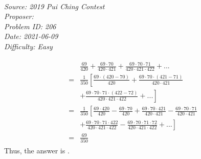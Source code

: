 \SSbreak\\
\emph{Source: 2019 Pui Ching Contest}\\
\emph{Proposer: \Pqs}\\ %
\emph{Problem ID: 206}\\
\emph{Date: 2021-06-09}\\
\emph{Difficulty: Easy}\\
\SSbreak

\bigskip

\begin{solution}\hfil\medskip
  
    \begin{align} \begin{split}
        &\frac{69}{420} + \frac{69\cdot 70}{420\cdot 421} + \frac{69\cdot 70\cdot 71}{420\cdot 421\cdot 422} + ... \\
        =& \frac{1}{350} \left[ \frac{69\cdot (420-70)}{420} + \frac{69\cdot 70\cdot (421-71)}{420\cdot 421} \right. \\
        &+ \left. \frac{69\cdot 70\cdot 71\cdot (422-72)}{420\cdot 421\cdot 422} + ... \right] \\
        =& \frac{1}{350} \left[ \frac{69\cdot 420}{420} - \frac{69\cdot 70}{420} + \frac{69\cdot 70\cdot 421}{420\cdot 421} - \frac{69\cdot 70\cdot 71}{420\cdot 421} \right. \\
        &+ \left. \frac{69\cdot 70\cdot 71\cdot 422}{420\cdot 421\cdot 422} - \frac{69\cdot 70\cdot 71\cdot 72}{420\cdot 421\cdot 422} + ... \right] \\
        =& \frac{69}{350}
    \end{split} \end{align}
        Thus, the answer is .
\end{solution}\bigskip
